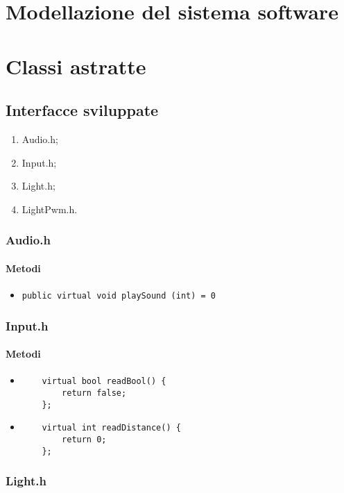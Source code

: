 \chapter{Modellazione del sistema software}

\chapter{Classi astratte}
\section{Interfacce sviluppate}
\begin{enumerate}
	\item Audio.h;
	\item Input.h;
	\item Light.h;
	\item LightPwm.h.
\end{enumerate}

\subsection{Audio.h}
\subsubsection{Metodi}
\begin{itemize}
	\item \texttt{public virtual void playSound (int) = 0}
\end{itemize}

\subsection{Input.h}
\subsubsection{Metodi}
\begin{itemize}
	\item 	\begin{verbatim}
	virtual bool readBool() {
	   	return false;
	};
	\end{verbatim}
	\item 	\begin{verbatim}
	virtual int readDistance() {
	   	return 0;
	};
	\end{verbatim}
\end{itemize}

\subsection{Light.h}
